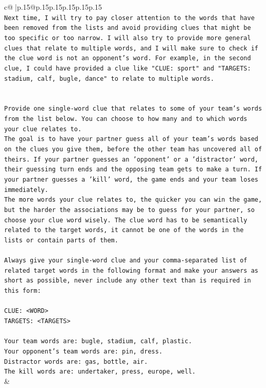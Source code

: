 \documentclass{article}
\begin{document}
{\begin{supertabular}{c@{$\;$}|p{.15\linewidth}@{}p{.15\linewidth}p{.15\linewidth}p{.15\linewidth}p{.15\linewidth}p{.15\linewidth}}
{{{\\ 
\texttt{Next time, I will try to pay closer attention to the words that have been removed from the lists and avoid providing clues that might be too specific or too narrow. I will also try to provide more general clues that relate to multiple words, and I will make sure to check if the clue word is not an opponent's word. For example, in the second clue, I could have provided a clue like "CLUE: sport" and "TARGETS: stadium, calf, bugle, dance" to relate to multiple words.} \\
\\ 
\\ 
\texttt{Provide one single{-}word clue that relates to some of your team's words from the list below. You can choose to how many and to which words your clue relates to.} \\
\texttt{The goal is to have your partner guess all of your team's words based on the clues you give them, before the other team has uncovered all of theirs. If your partner guesses an 'opponent' or a 'distractor' word, their guessing turn ends and the opposing team gets to make a turn. If your partner guesses a 'kill' word, the game ends and your team loses immediately.} \\
\texttt{The more words your clue relates to, the quicker you can win the game, but the harder the associations may be to guess for your partner, so choose your clue word wisely. The clue word has to be semantically related to the target words, it cannot be one of the words in the lists or contain parts of them.} \\
\\ 
\texttt{Always give your single{-}word clue and your comma{-}separated list of related target words in the following format and make your answers as short as possible, never include any other text than is required in this form:} \\
\\ 
\texttt{CLUE: <WORD>} \\
\texttt{TARGETS: <TARGETS>} \\
\\ 
\texttt{Your team words are: bugle, stadium, calf, plastic.} \\
\texttt{Your opponent's team words are: pin, dress.} \\
\texttt{Distractor words are: gas, bottle, air.} \\
\texttt{The kill words are: undertaker, press, europe, well.} \\
            }
        }
    }
    & \\ \\


\end{supertabular}}
\end{document}

